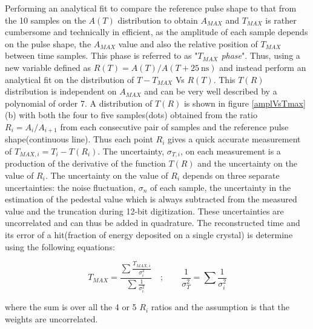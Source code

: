 Performing an analytical fit to compare the reference pulse shape to that from the 10 samples on the $A(T)$ distribution to obtain $A_{MAX}$ and $T_{MAX}$ is rather cumbersome and technically in efficient, as the amplitude of each sample depends on the pulse shape, the $A_{MAX}$ value and also the relative position of $T_{MAX}$ between time samples. This phase is referred to as "\textit{$T_{MAX}$ phase}".
Thus, using a new variable defined as $R(T) = A(T)/ A(T + 25~\mbox{ns})$ and instead perform an analytical fit on the distribution of $T - T_{MAX}$ Vs $ R(T)$. This  $T(R)$ distribution is independent on $A_{MAX}$ and can be very well described by a polynomial of order 7. A distribution of $T(R)$ is shown in figure \eqref{amplVsTmax}(b) with both the four to five samples(dots) obtained from the ratio $R_{i} = A_{i}/A_{i+1}$ from each consecutive pair of samples and the reference pulse shape(continuous line). Thus each point $R_{i}$ gives a quick accurate measurement of $T_{MAX,i} = T_{i} - T(R_{i})$. The uncertainty, $\sigma_{T,i}$, on each measurement is a production of the derivative of the function $T(R)$ and the uncertainty on the value of $R_{i}$. The uncertainty on the value of $R_{i}$ depends on three separate uncertainties: the noise fluctuation, $\sigma_{n}$ of each sample, the uncertainty in the estimation of the pedestal value which is always subtracted from the measured value and the truncation during 12-bit digitization. These uncertainties are uncorrelated and can thus be added in quadrature.
The reconstructed time and its error of a hit(fraction of energy deposited on a single crystal) is determine using the following equations:


\begin{equation}
\displaystyle{T_{MAX} = \frac{\sum \frac{T_{MAX,i}}{\sigma^{2}_{i}}}{\sum \frac{1}{\sigma^{2}_{i}}}} \quad ; \quad\quad
\displaystyle{\frac{1}{\sigma^{2}_{T}} =  \sum \frac{1}{\sigma^{2}_{i}} }
\end{equation}

where the sum is over all the 4 or 5 $R_{i}$ ratios and the assumption is that the weights are uncorrelated. 

